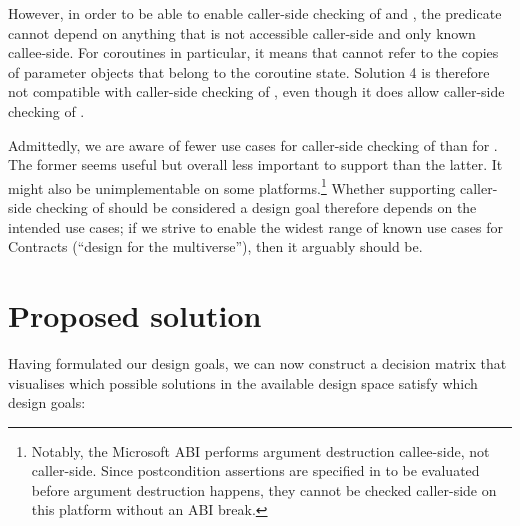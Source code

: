 However, in order to be able to enable caller-side checking of  and , the predicate cannot depend on anything that is not accessible caller-side and only known callee-side. For coroutines in particular, it means that  cannot refer to the copies of parameter objects that belong to the coroutine state. Solution 4 is therefore not compatible with caller-side checking of , even though it does allow caller-side checking of .

Admittedly, we are aware of fewer use cases for caller-side checking of  than for . The former seems useful but overall less important to support than the latter. It might also be unimplementable on some platforms.\footnote{Notably, the Microsoft ABI performs argument destruction callee-side, not caller-side. Since postcondition assertions are specified in \cite{P2900R8} to be evaluated before argument destruction happens, they cannot be checked caller-side on this platform without an ABI break.} Whether supporting caller-side checking of  should be considered a design goal therefore depends on the intended use cases; if we strive to enable the widest range of known use cases for Contracts (``design for the multiverse''), then it arguably should be.

\section{Proposed solution}

Having formulated our design goals, we can now construct a decision matrix that visualises which possible solutions in the available design space satisfy which design goals:


